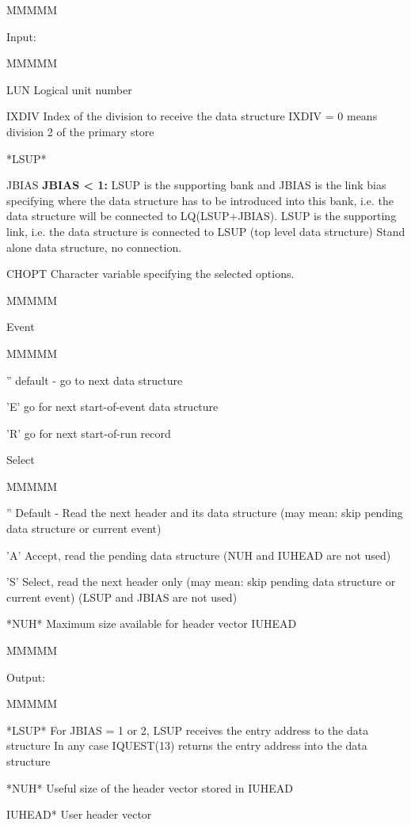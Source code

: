 \begin{DL}{MMMMM}
\item[Input:
]
\begin{DL}{MMMMM}
\item[LUN
]Logical unit number
\item[IXDIV
]Index of the division to receive the data structure
\newline IXDIV = 0 means division 2 of the primary store
\item[*LSUP*
]
\item[JBIAS
]{\bf JBIAS < 1:} LSUP is the supporting bank
and JBIAS is the link bias specifying where the data structure has to be
introduced into this bank, i.e. the data structure will be connected
to LQ(LSUP+JBIAS).
LSUP is the supporting link, i.e. the data structure
is connected to LSUP (top level data structure)
 Stand alone data structure, no connection.
\item[CHOPT
]Character variable specifying the selected options.
\begin{DL}{MMMMM}
\item[Event
]
\begin{DL}{MMMMM}
\item[''
]default - go to next data structure
\item['E'
]go for next start-of-event data structure
\item['R'
]go for next start-of-run record
\end{DL}
\item[Select
]
\begin{DL}{MMMMM}
\item[''
]Default - Read the next header and its data structure
\newline (may mean: skip pending data structure or current event)
\item['A'
]Accept, read the pending data structure
\newline (NUH and IUHEAD are not used)
\item['S'
]Select, read the next header only
\newline (may mean: skip pending data structure or current event)
\newline (LSUP and JBIAS are not used)
\end{DL}
\end{DL}
\item[*NUH*
]Maximum size available for header vector IUHEAD
\end{DL}
\end{DL}
\begin{DL}{MMMMM}
\item[Output:
]
\begin{DL}{MMMMM}
\item[*LSUP*
]For JBIAS = 1 or 2, LSUP receives
the entry address to the data structure
\newline In any case IQUEST(13) returns the entry address
into the data structure
\item[*NUH*
]Useful size of the header vector stored in IUHEAD
\item[IUHEAD*
]User header vector
\end{DL}
\end{DL}
